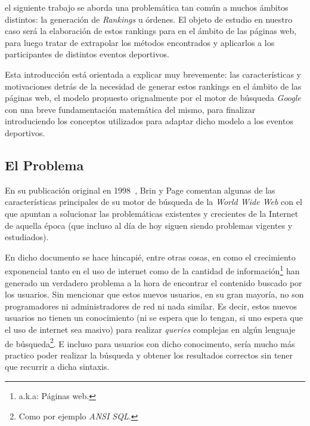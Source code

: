 \par {} el siguiente trabajo se aborda una problem\'atica tan
com\'un a muchos \'ambitos distintos: la generaci\'on de \textit{Rankings} u
\'ordenes. El objeto de estudio en nuestro caso ser\'a la elaboraci\'on de estos
rankings para en el \'ambito de las p\'aginas web, para luego tratar de
extrapolar los m\'etodos encontrados y aplicarlos a los participantes de
distintos eventos deportivos.

\par Esta introducci\'on est\'a orientada a explicar muy brevemente: las
caracter\'isticas y motivaciones detr\'as de la necesidad de generar estos
rankings en el \'ambito de las p\'aginas web, el modelo propuesto orignalmente
por el motor de b\'usqueda \emph{Google} con una breve fundamentaci\'on
matem\'atica del mismo, para finalizar introduciendo los conceptos utilizados
para adaptar dicho modelo a los eventos deportivos.

\subsection{El Problema}
\par En su publicaci\'on original en 1998~\cite{Brin1998}, Brin y Page comentan
algunas de las caracter\'isticas principales de su motor de b\'usqueda de la
\emph{World Wide Web} con el que apuntan a solucionar las problem\'aticas
existentes y crecientes de la Internet de aquella \'epoca (que incluso al d\'ia
de hoy siguen siendo problemas vigentes y estudiados).

\par En dicho documento se hace hincapi\'e, entre otras cosas, en como el
crecimiento exponencial tanto en el uso de internet como de la cantidad de
informaci\'on\footnote{a.k.a: P\'aginas web.} han generado un verdadero problema
a la hora de encontrar el contenido buscado por los usuarios. Sin mencionar que
estos nuevos usuarios, en su gran mayor\'ia, no son programadores ni
administradores de red ni nada similar. Es decir, estos nuevos usuarios no
tienen un conocimiento (ni se espera que lo tengan, si uno espera que el uso de
internet sea masivo) para realizar \emph{queries} complejas en alg\'un lenguaje
de b\'usqueda\footnote{Como por ejemplo \emph{ANSI SQL}.}. E incluso para
usuarios con dicho conocimento, ser\'ia mucho m\'as practico poder realizar la
b\'usqueda y obtener los resultados correctos sin tener que recurrir a dicha
sintaxis.

